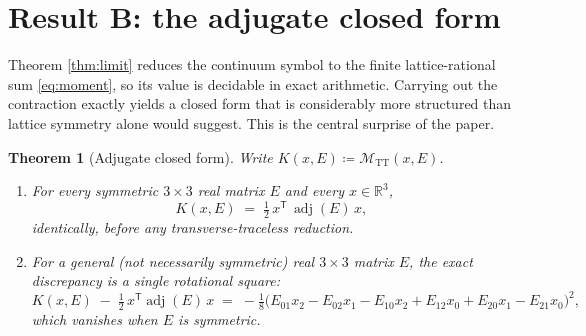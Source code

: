 \documentclass[11pt]{article}
\newtheorem{theorem}{Theorem}[section]
\theoremstyle{definition}
\theoremstyle{remark}
\DeclareMathOperator{\adjE}{adj}
\newcommand{\R}{\mathbb{R}}
\newcommand{\TT}{\mathrm{TT}}
\newcommand{\trans}{\mathsf{T}}
\begin{document}
\section{Result B: the adjugate closed form}
\label{sec:adjugate}

Theorem \ref{thm:limit} reduces the continuum symbol to the finite lattice-rational sum \eqref{eq:moment}, so its value is decidable in exact arithmetic. Carrying out the contraction exactly yields a closed form that is considerably more structured than lattice symmetry alone would suggest. This is the central surprise of the paper.

\begin{theorem}[Adjugate closed form]
\label{thm:adjugate}
Write $K(x,E) \coloneqq \mathcal{M}_{\TT}(x,E)$.
\begin{enumerate}
\item[(i)] For every symmetric $3\times 3$ real matrix $E$ and every $x\in\R^3$,
\begin{equation}
K(x,E) \;=\; \tfrac12\, x^{\trans}\,\adjE(E)\,x,
\label{eq:adjclosed}
\end{equation}
identically, before any transverse-traceless reduction.
\item[(ii)] For a general (not necessarily symmetric) real $3\times 3$ matrix $E$, the exact discrepancy is a single rotational square:
\begin{equation}
K(x,E) \;-\; \tfrac12\, x^{\trans}\adjE(E)\,x
\;=\; -\tfrac18\bigl(E_{01}x_2 - E_{02}x_1 - E_{10}x_2 + E_{12}x_0 + E_{20}x_1 - E_{21}x_0\bigr)^{2},
\label{eq:remainder}
\end{equation}
which vanishes when $E$ is symmetric.
\end{enumerate}
\end{theorem}
\end{document}
